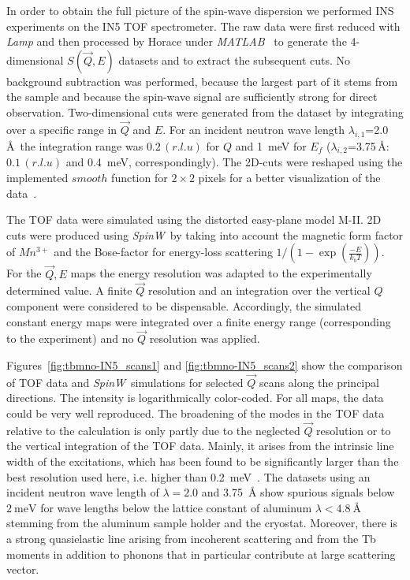 \documentclass[aps,prb,twocolumn,superscriptaddress,showpacs,floatfix]{revtex4-2}
\newcommand{\spinw}{\textit{SpinW}}
\newcommand{\horace}{\textit{HORACE}}
\newcommand{\matlab}{\textit{MATLAB}}
\begin{document}
In order to obtain the full picture of the spin-wave dispersion we performed INS experiments on the IN5 TOF spectrometer.
The raw data were first reduced with {\it{Lamp}} \cite{Richard1996} and then processed by Horace under
 \matlab~\cite{progHorace} to generate the  4-dimensional $S(\vec{Q},E)$ datasets and to extract the subsequent cuts.
No background subtraction was performed, because the largest part of it stems from the sample and because the spin-wave signal are sufficiently strong for direct observation. Two-dimensional cuts were generated from the dataset by integrating over a specific range in $\vec{Q}$ and $E$. For an incident neutron wave length $\lambda_{i,1}$=2.0\,\AA \ the integration range was $0.2\,(r.l.u)$ for $Q$ and \SI{1}{\meV} for $E_f$ ($\lambda_{i,2}$=3.75\,\AA : $0.1\,(r.l.u)$ and \SI{0.4}{\meV}, correspondingly). The 2D-cuts were reshaped using the implemented $smooth$ function for $2\times2$ pixels for a better visualization of the data~\cite{progHorace}.

The  TOF data were simulated using the distorted easy-plane model M-II. 2D cuts were produced using \spinw\ by taking into account the magnetic form factor of $Mn^{3+}$ and the Bose-factor for energy-loss scattering $1/(1-\exp(\frac{-E}{k_bT}))$. For the $\vec{Q},E$ maps the energy resolution was adapted to the experimentally determined value. A finite ${\vec{Q}}$ resolution and an integration over the vertical $Q$ component were considered to be dispensable. Accordingly, the simulated constant energy maps were integrated over a finite energy range (corresponding to the experiment) and no ${\vec{Q}}$ resolution was applied.

Figures~\ref{fig:tbmno-IN5_scans1} and \ref{fig:tbmno-IN5_scans2} show the comparison of TOF data and \spinw\ simulations for selected $\vec{Q}$ scans along the principal directions. The intensity is logarithmically color-coded. For all maps, the data could be very well reproduced. The broadening of the modes in the TOF data relative to the calculation is only partly due to the neglected ${\vec{Q}}$ resolution or to the vertical integration of the TOF data. Mainly, it arises from the intrinsic line width of the excitations, which has been found to be significantly larger than the best resolution used here, i.e. higher than \SI{0.2}{\meV}~\cite{Senff2008a}. The datasets using an incident neutron wave length of $\lambda=2.0$ and \SI{3.75}{\angstrom} show spurious signals below $\SI{2}{\meV}$ for wave lengths below the lattice constant of aluminum $\lambda<\SI{4.8}{\angstrom}$ stemming from the aluminum sample holder and the cryostat. Moreover,
there is a strong quasielastic line arising from incoherent scattering and from the Tb moments in addition to
phonons that in particular contribute at large scattering vector.
\end{document}

